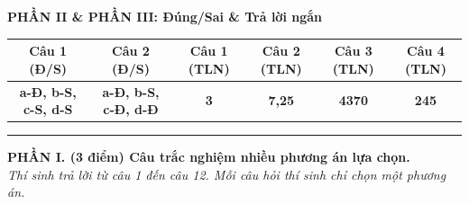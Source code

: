 \documentclass[11pt,a4paper]{article}
\begin{document}
\textbf{\color{mainGreen}PHẦN II \& PHẦN III: Đúng/Sai \& Trả lời ngắn}
\begin{center}
\small
\begin{tabular}{|c|c|c|c|c|c|}
\hline
\rowcolor{tableGreen}
\textbf{Câu 1 (Đ/S)} & \textbf{Câu 2 (Đ/S)} & \textbf{Câu 1 (TLN)} & \textbf{Câu 2 (TLN)} & \textbf{Câu 3 (TLN)} & \textbf{Câu 4 (TLN)} \\
\hline
\textbf{\color{ansRed}a-Đ, b-S, c-S, d-S} & \textbf{\color{ansRed}a-Đ, b-S, c-Đ, d-Đ} & \textbf{\color{ansRed}3} & \textbf{\color{ansRed}7,25} & \textbf{\color{ansRed}4370} & \textbf{\color{ansRed}245} \\
\hline
\end{tabular}
\end{center}
\par\vspace{-2pt}\noindent\textcolor{hfGreen}{\rule{\textwidth}{0.75pt}}\par\vspace{4pt}


\noindent\textbf{\large\color{mainGreen}PHẦN I. (3 điểm) Câu trắc nghiệm nhiều phương án lựa chọn.}\\
\textit{Thí sinh trả lời từ câu 1 đến câu 12. Mỗi câu hỏi thí sinh chỉ chọn một phương án.}
\vspace{4pt}
\end{document}
